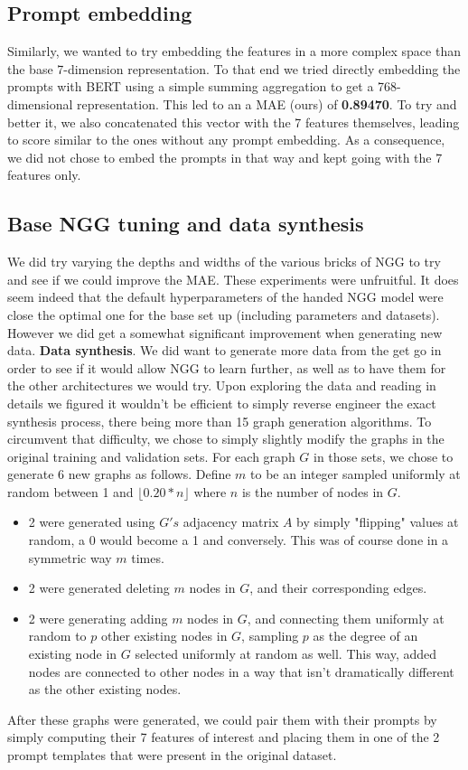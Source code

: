 \documentclass[10pt,twocolumn,letterpaper]{article}
\begin{document}
\subsection{Prompt embedding}
\label{subsec:bert}
Similarly, we wanted to try embedding the features in a more complex space than the base 7-dimension representation. To that end we tried directly embedding the prompts with BERT \cite{bert} using a simple summing aggregation to get a 768-dimensional representation. This led to an a MAE (ours) of \textbf{0.89470}. To try and better it, we also concatenated this vector with the 7 features themselves, leading to score similar to the ones without any prompt embedding. As a consequence, we did not chose to embed the prompts in that way and kept going with the 7 features only.

\subsection{Base NGG tuning and data synthesis}
\label{subsec:data_gen}
We did try varying the depths and widths of the various bricks of NGG to try and see if we could improve the MAE. These experiments were unfruitful. It does seem indeed that the default hyperparameters of the handed NGG model were close the optimal one for the base set up (including parameters and datasets). However we did get a somewhat significant improvement when generating new data.
\textbf{Data synthesis}. We did want to generate more data from the get go in order to see if it would allow NGG to learn further, as well as to have them for the other architectures we would try. Upon exploring the data and reading \cite{evdaimon2024neuralgraphgeneratorfeatureconditioned} in details we figured it wouldn't be efficient to simply reverse engineer the exact synthesis process, there being more than 15 graph generation algorithms. To circumvent that difficulty, we chose to simply slightly modify the graphs in the original training and validation sets. For each graph $G$ in those sets, we chose to generate 6 new graphs as follows. Define $m$ to be an integer sampled uniformly at random between 1 and $\lfloor 0.20 * n \rfloor$ where $n$ is the number of nodes in $G$.
\begin{itemize}
    \item 2 were generated using $G's$ adjacency matrix $A$ by simply "flipping" values at random, \eg a 0 would become a 1 and conversely. This was of course done in a symmetric way $m$ times.
    \item 2 were generated deleting $m$ nodes in $G$, and their corresponding edges.
    \item 2 were generating adding $m$ nodes in $G$, and connecting them uniformly at random to $p$ other existing nodes in $G$, sampling $p$ as the degree of an existing node in $G$ selected uniformly at random as well. This way, added nodes are connected to other nodes in a way that isn't dramatically different as the other existing nodes.
\end{itemize}
After these graphs were generated, we could pair them with their prompts by simply computing their 7 features of interest and placing them in one of the 2 prompt templates that were present in the original dataset.
\end{document}
